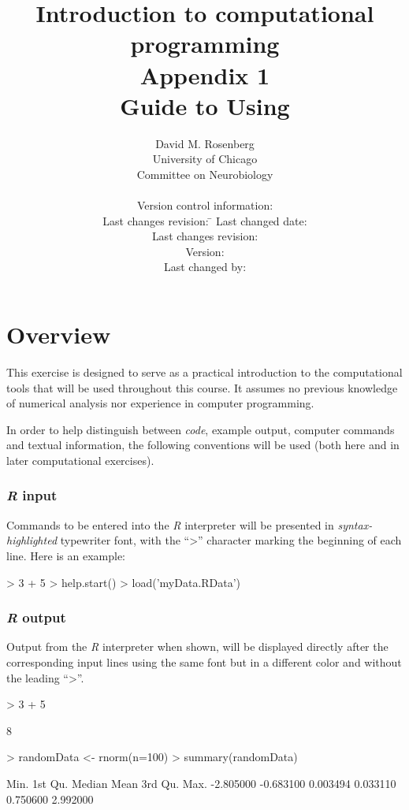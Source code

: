 \documentclass[10pt,letterpaper]{article}
\title{Introduction to computational programming\\\smaller Appendix 1\\\smaller Guide to Using \R}
\author{David M. Rosenberg\\\small University of Chicago\\\small Committee on Neurobiology\medskip\\
{\footnotesize \parbox[t]{10cm} {
Version control information:
\begin{tabbing}
\footnotesize\sffamily
 Last changes revision: \= \kill
 Last changed date: \> \svndate\\
 Last changes revision: \> \svnrev\\
 Version: \> \svnFullRevision*{\svnrev}\\
 Last changed by: \> \svnFullAuthor*{\svnauthor}\\
\end{tabbing}
}
}}
\begin{document}
\maketitle

\section{Overview}

This exercise is designed to serve as a practical introduction to the computational tools that will be used throughout this course.  It assumes no previous knowledge of numerical analysis nor experience in computer programming.

In order to help distinguish between \emph{code}, example output, computer commands and textual information, the following conventions will be used (both here and in later computational exercises).

\subsubsection{\emph{R} input}

Commands to be entered into the \emph{R} interpreter will be presented in \emph{syntax-highlighted} typewriter font, with the ``>'' character marking the beginning of each line.  Here is an example:

\begin{Schunk}
\begin{Sinput}
> 3 + 5
> help.start()
> load('myData.RData')
\end{Sinput}
\end{Schunk}

\subsubsection{\emph{R} output}

Output from the \emph{R} interpreter when shown, will be displayed directly after the corresponding input lines using the same font but in a different color and without the leading ``>''.

\begin{Schunk}
\begin{Sinput}
> 3 + 5
\end{Sinput}
\begin{Soutput}
[1] 8
\end{Soutput}
\begin{Sinput}
> randomData <- rnorm(n=100)
> summary(randomData)
\end{Sinput}
\begin{Soutput}
     Min.   1st Qu.    Median      Mean   3rd Qu.      Max. 
-2.805000 -0.683100  0.003494  0.033110  0.750600  2.992000 
\end{Soutput}
\end{Schunk}
\end{document}
